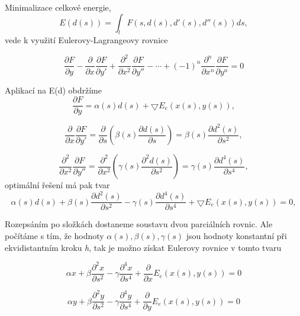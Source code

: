 \documentclass[oneside,12pt,a4paper]{book}
\begin{document}
Minimalizace celkové energie, 
\begin{equation}
    E(d(s))=\int_l F(s,d(s),d'(s),d''(s))ds,
\end{equation}
vede k využití Eulerovy-Lagrangeovy rovnice

\begin{equation}
     \frac{\partial F}{\partial y} - \frac{\partial }{\partial x}\frac{\partial F}{\partial y'} +\frac{\partial^2 }{\partial x^2}\frac{\partial F}{\partial y''} - \cdots + (-1)^n \frac{\partial^n }{\partial x^n}\frac{\partial F}{\partial y^n} = 0
\end{equation}

Aplikací na E(d) obdržíme 
\begin{equation}
    \frac{\partial F}{\partial y}= \alpha(s)d(s) + \bigtriangledown E_e (x(s),y(s)),
\end{equation}

\begin{equation}
    \frac{\partial }{\partial x}\frac{\partial F}{\partial y'} = \frac{\partial }{\partial s}
    \left( \beta(s)\frac{\partial d(s)}{\partial s} \right) =  \beta(s)\frac{\partial d^2(s)}{\partial s^2},
\end{equation}

\begin{equation}
    \frac{\partial ^2}{\partial x^2}\frac{\partial F}{\partial y''} = \frac{\partial^2 }{\partial x^2}
    \left( \gamma(s)\frac{\partial^2 d(s)}{\partial s^2} \right) =  \gamma(s)\frac{\partial d^4(s)}{\partial s^4},
\end{equation}
optimální řešení má pak tvar
\begin{equation}
    \alpha(s)d(s) + \beta(s)\frac{\partial d^2(s)}{\partial s^2} -\gamma(s)\frac{\partial d^4(s)}{\partial s^4} + \bigtriangledown E_e (x(s),y(s)) = 0,
\end{equation}

Rozepsáním po složkách dostaneme soustavu dvou parciálních rovnic. Ale počítáme s tím, že hodnoty $\alpha(s), \beta(s), \gamma(s)$ jsou hodnoty konstantní při ekvidistantním kroku \emph{h}, tak je možno získat Eulerovy rovnice v tomto tvaru

\begin{equation}
\alpha x + \beta\frac{\partial^2x}{\partial s^2} - \gamma\frac{\partial^4x}{\partial s^4} + \frac{\partial}{\partial x} E_e (x(s),y(s)) = 0
\end{equation}

\begin{equation}
\alpha y + \beta\frac{\partial^2y}{\partial s^2} - \gamma\frac{\partial^4y}{\partial s^4} + \frac{\partial}{\partial y} E_e (x(s),y(s)) = 0
\end{equation}
\end{document}
